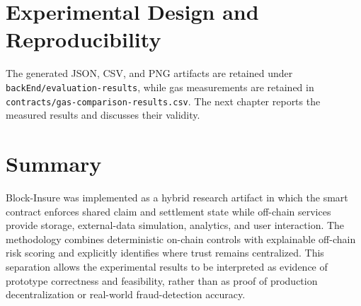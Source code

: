 \section{Experimental Design and Reproducibility}
\label{sec:experimental_design}

\begin{table}[htbp]
\centering
\caption{Experimental protocols used to evaluate the artifact}
\label{tab:experiment_protocols}
\end{table}

The generated JSON, CSV, and PNG artifacts are retained under
\texttt{backEnd/evaluation-results}, while gas measurements are retained in
\texttt{contracts/gas-comparison-results.csv}. The next chapter reports the
measured results and discusses their validity.

\section{Summary}

Block-Insure was implemented as a hybrid research artifact in which the smart
contract enforces shared claim and settlement state while off-chain services
provide storage, external-data simulation, analytics, and user interaction. The
methodology combines deterministic on-chain controls with explainable off-chain
risk scoring and explicitly identifies where trust remains centralized. This
separation allows the experimental results to be interpreted as evidence of
prototype correctness and feasibility, rather than as proof of production
decentralization or real-world fraud-detection accuracy.
